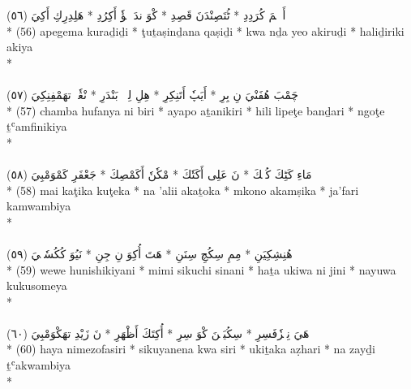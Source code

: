 \documentclass[a4paper, 12pt]{report}
\begin{document}
\begin{center}
\textarabic{(٥٦) \textcolor{mygreen}{أَپٖڠٖمَ كُرَدِدِ  * ٹُتَصِنْدَنَ قَصِدِ  * كْوَ ندَ يٖؤٗ أَكِرُدِ  * هَلِدِرِكِ أَكِيَ }} \\* 
(56) apegema kuraḏiḏi  * ţuṯaṣinḏana qaṣiḏi  * kwa nḏa yeo akiruḏi  * haliḏiriki akiya  \\* 
 \\ 
\\[8mm] 

\textarabic{(٥٧) \textcolor{mygreen}{چَمْبَ هُفَنْيَ نِ بِرِ  * أَيَپٗ أَتَنِكِرِ  * هِلِ لِپٖٹٖ بَنْدَرِ  * نْڠٗٹٖ تهَمْفِنِكِيَ }} \\* 
(57) chamba hufanya ni biri  * ayapo aṯanikiri  * hili lipeţe banḏari  * ngoţe ṯʿamfinikiya  \\* 
 \\ 
\\[8mm] 

\textarabic{(٥٨) \textcolor{mygreen}{مَاءِ كَٹِكَ كُٹٖكَ  * نَ عَلِى أَكَتٗكَ  * مْكٗنٗ أَكَمْصِكَ  * جَعْفَرِ كَمْوَمْبِيَ }} \\* 
(58) mai kaţika kuţeka  * na 'alii akaṯoka  * mkono akamṣika  * ja'fari kamwambiya  \\* 
 \\ 
\\[8mm] 

\textarabic{(٥٩) \textcolor{mygreen}{وٖوٖ هُنِشِكِيَنِ  * مِمِ سِكُچِ سِنَنِ  * هَتَ أُكِوَ نِ جِنِ  * نَيُوَ كُكُسٗمٖيَ }} \\* 
(59) wewe hunishikiyani  * mimi sikuchi sinani  * haṯa ukiwa ni jini  * nayuwa kukusomeya  \\* 
 \\ 
\\[8mm] 

\textarabic{(٦٠) \textcolor{mygreen}{هَيَ نِمٖزٗفَسِرِ  * سِكُيَنٖنَ كْوَ سِرِ  * أُكِتَكَ أَظْهَرِ  * نَ زَيْدِ تهَكْوَمْبِيَ }} \\* 
(60) haya nimezofasiri  * sikuyanena kwa siri  * ukiṯaka aẓhari  * na zayḏi ṯʿakwambiya  \\* 
 \\ 
\\[8mm] 


\end{center}
\end{document}
